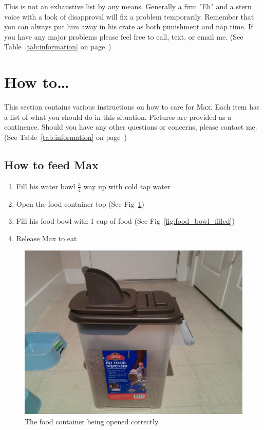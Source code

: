 \documentclass[pdftex,12pt]{article}
\begin{document}
\bigskip

This is not an exhaustive list by any means. Generally a firm "Eh" and a stern
voice with a look of disapproval will fix a problem temporarily. Remember that
you can always put him away in his crate as both punishment and nap time. If you
have any major problems please feel free to call, text, or email me.
(See Table~\ref{tab:information} on page~\pageref{tab:information})

\newpage
\section{How to\ldots}

This section contains various instructions on how to care for Max. Each item has
a list of what you should do in this situation. Pictures are provided as a
continence. Should you have any other questions or concerns, please contact me.
(See Table~\ref{tab:information} on page~\pageref{tab:information})

\subsection{How to feed Max}
\begin{enumerate}\label{itm:how_to_feed}
    \item Fill his water bowl $\frac{3}{4}$ way up with cold tap water
    \item Open the food container top (See Fig~\ref{fig:food_container_open})
    \item Fill his food bowl with 1 cup of food (See Fig~\ref{fig:food_bowl_filled})
    \item Release Max to eat
\end{enumerate}

\bigskip

\begin{figure}[h!]
    \centering
    \includegraphics[width=.35\textwidth]{./images/how_to/feed_max/food_container_open.jpg}
    \caption{The food container being opened correctly.}
    \label{fig:food_container_open}
\end{figure}
\end{document}
